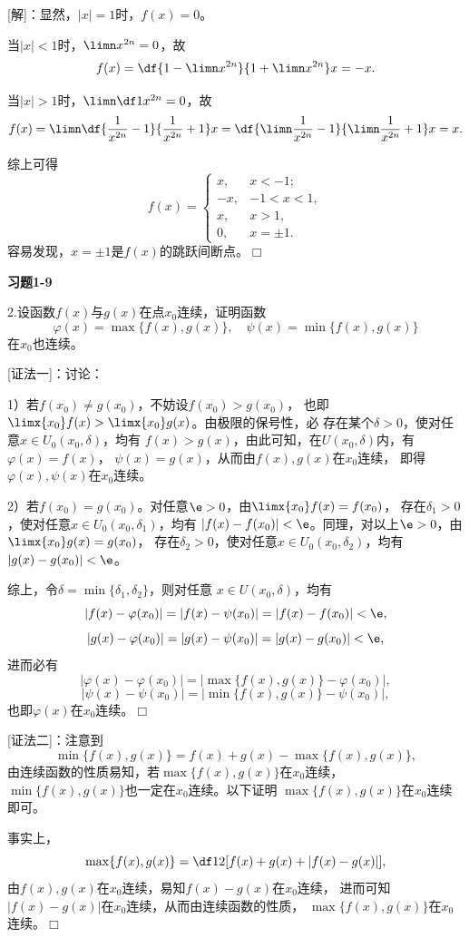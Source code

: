 [解]：显然，$|x|=1$时，$f(x)=0$。

当$|x|<1$时，$\limn x^{2n}=0$，故
$$f(x)=\df{1-\limn x^{2n}}{1+\limn x^{2n}}x=-x.$$

当$|x|>1$时，$\limn\df1{x^{2n}}=0$，故
$$f(x)=\limn\df{\frac1{x^{2n}}-1}{\frac1{x^{2n}}+1}x
=\df{\limn\frac1{x^{2n}}-1}{\limn\frac1{x^{2n}}+1}x=x.$$

综上可得
$$
	f(x)=\left\{\begin{array}{ll}
		x,& x<-1;\\
		-x, & -1<x<1, \\
		x, & x>1,\\	
		0, & x=\pm1.	
	\end{array}\right.
$$
容易发现，$x=\pm1$是$f(x)$的跳跃间断点。\hfill$\Box$

\begin{center}
	\bf 习题1-9
\end{center}

\bigskip

2.设函数$f(x)$与$g(x)$在点$x_0$连续，证明函数
$$\varphi(x)=\max\{f(x),g(x)\},\quad
\psi(x)=\min\{f(x),g(x)\}$$
在$x_0$也连续。

[证法一]：讨论：

1）若$f(x_0)\ne g(x_0)$，不妨设$f(x_0)>g(x_0)$，
也即$\limx{x_0}f(x)>\limx{x_0}g(x)$。由极限的保号性，必
存在某个$\delta>0$，使对任意$x\in U_0(x_0,\delta)$，均有
$f(x)>g(x)$，由此可知，在$U(x_0,\delta)$内，有$\varphi(x)=f(x)$，
$\psi(x)=g(x)$，从而由$f(x),g(x)$在$x_0$连续，
即得$\varphi(x),\psi(x)$在$x_0$连续。

2）若$f(x_0)=g(x_0)$。对任意$\e>0$，由$\limx{x_0}f(x)=f(x_0)$，
存在$\delta_1>0$，使对任意$x\in U_0(x_0,\delta_1)$，均有
$|f(x)-f(x_0)|<\e$。同理，对以上$\e>0$，由$\limx{x_0}g(x)=g(x_0)$，
存在$\delta_2>0$，使对任意$x\in U_0(x_0,\delta_2)$，均有
$|g(x)-g(x_0)|<\e$。

综上，令$\delta=\min\{\delta_1,\delta_2\}$，则对任意
$x\in U(x_0,\delta)$，均有
$$|f(x)-\varphi(x_0)|=|f(x)-\psi(x_0)|=|f(x)-f(x_0)|<\e,$$
$$|g(x)-\varphi(x_0)|=|g(x)-\psi(x_0)|=|g(x)-g(x_0)|<\e,$$
进而必有
$$|\varphi(x)-\varphi(x_0)|=|\max\{f(x),g(x)\}-\varphi(x_0)|,$$
$$|\psi(x)-\psi(x_0)|=|\min\{f(x),g(x)\}-\psi(x_0)|,$$
也即$\varphi(x)$在$x_0$连续。\hfill$\Box$

[证法二]：注意到
$$\min\{f(x),g(x)\}=f(x)+g(x)-\max\{f(x),g(x)\},$$
由连续函数的性质易知，若$\max\{f(x),g(x)\}$在$x_0$连续，
$\min\{f(x),g(x)\}$也一定在$x_0$连续。以下证明
$\max\{f(x),g(x)\}$在$x_0$连续即可。

事实上，
$$\max\{f(x),g(x)\}=\df12[f(x)+g(x)+|f(x)-g(x)|],$$
由$f(x),g(x)$在$x_0$连续，易知$f(x)-g(x)$在$x_0$连续，
进而可知$|f(x)-g(x)|$在$x_0$连续，从而由连续函数的性质，
$\max\{f(x),g(x)\}$在$x_0$连续。\hfill$\Box$

